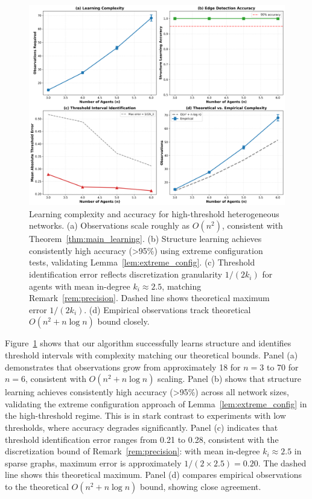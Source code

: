 \documentclass[conference]{IEEEtran}
\begin{document}
\begin{figure}[t]
\centering
\includegraphics[width=\textwidth]{learning_complexity.png}
\caption{Learning complexity and accuracy for high-threshold heterogeneous networks. (a) Observations scale roughly as $O(n^2)$, consistent with Theorem~\ref{thm:main_learning}. (b) Structure learning achieves consistently high accuracy (>95\%) using extreme configuration tests, validating Lemma~\ref{lem:extreme_config}. (c) Threshold identification error reflects discretization granularity $1/(2k_i)$ for agents with mean in-degree $k_i \approx 2.5$, matching Remark~\ref{rem:precision}. Dashed line shows theoretical maximum error $1/(2k_i)$. (d) Empirical observations track theoretical $O(n^2 + n \log n)$ bound closely.}
\label{fig:complexity}
\end{figure}

Figure~\ref{fig:complexity} shows that our algorithm successfully learns structure and identifies threshold intervals with complexity matching our theoretical bounds. Panel (a) demonstrates that observations grow from approximately 18 for $n=3$ to 70 for $n=6$, consistent with $O(n^2 + n \log n)$ scaling. Panel (b) shows that structure learning achieves consistently high accuracy (>95\%) across all network sizes, validating the extreme configuration approach of Lemma~\ref{lem:extreme_config} in the high-threshold regime. This is in stark contrast to experiments with low thresholds, where accuracy degrades significantly. Panel (c) indicates that threshold identification error ranges from 0.21 to 0.28, consistent with the discretization bound of Remark~\ref{rem:precision}: with mean in-degree $k_i \approx 2.5$ in sparse graphs, maximum error is approximately $1/(2 \times 2.5) = 0.20$. The dashed line shows this theoretical maximum. Panel (d) compares empirical observations to the theoretical $O(n^2 + n \log n)$ bound, showing close agreement.
\end{document}
